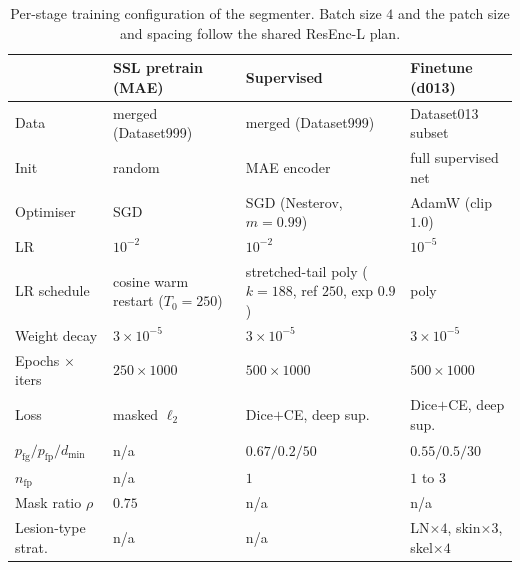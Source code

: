 \begin{table}[t]
  \centering
  \caption{Per-stage training configuration of the segmenter. Batch size $4$ and
  the patch size and spacing follow the shared ResEnc-L plan.}
  \label{tab:segstages}
  \small
  \begin{tabular}{@{}p{2.4cm}p{3.3cm}p{3.5cm}p{3.5cm}@{}}
    \toprule
     & SSL pretrain (MAE) & Supervised & Finetune (d013) \\
    \midrule
    Data            & merged (Dataset999) & merged (Dataset999) & Dataset013 subset \\
    Init            & random              & MAE encoder         & full supervised net \\
    Optimiser       & SGD                 & SGD (Nesterov, $m{=}0.99$) & AdamW (clip $1.0$) \\
    LR              & $10^{-2}$           & $10^{-2}$           & $10^{-5}$ \\
    LR schedule     & cosine warm restart ($T_0{=}250$) & stretched-tail poly ($k{=}188$, ref $250$, exp $0.9$) & poly \\
    Weight decay    & $3\times10^{-5}$    & $3\times10^{-5}$    & $3\times10^{-5}$ \\
    Epochs $\times$ iters & $250\times1000$ & $500\times1000$ & $500\times1000$ \\
    Loss            & masked $\ell_2$     & Dice$+$CE, deep sup.  & Dice$+$CE, deep sup. \\
    $p_{\mathrm{fg}}/p_{\mathrm{fp}}/d_{\min}$ & n/a & $0.67/0.2/50$ & $0.55/0.5/30$ \\
    $n_{\mathrm{fp}}$ & n/a               & $1$                 & $1$ to $3$ \\
    Mask ratio $\rho$ & $0.75$            & n/a                 & n/a \\
    Lesion-type strat. & n/a              & n/a                 & LN$\times4$, skin$\times3$, skel$\times4$ \\
    \bottomrule
  \end{tabular}
\end{table}